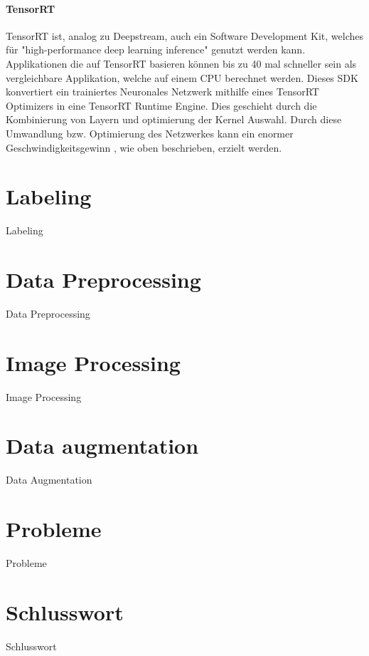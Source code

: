 \documentclass[a4paper,oneside,12pt]{report}
\begin{document}
\begin{onehalfspace}
		\subsubsection*{TensorRT}
		TensorRT ist, analog zu Deepstream, auch ein Software Development Kit, welches für "high-performance deep learning inference"
		 genutzt werden kann.
		Applikationen die auf TensorRT basieren können bis zu 40 mal schneller sein als vergleichbare Applikation, welche auf einem CPU berechnet werden.
		Dieses SDK konvertiert ein trainiertes Neuronales Netzwerk mithilfe eines TensorRT Optimizers in eine TensorRT Runtime Engine. Dies geschieht durch die Kombinierung von Layern und optimierung der Kernel Auswahl.
		Durch diese Umwandlung bzw. Optimierung des Netzwerkes kann ein enormer Geschwindigkeitsgewinn , wie oben beschrieben, erzielt werden.
	\end{onehalfspace}
	\chapter*{Labeling}
	\begin{onehalfspace}
		Labeling
	\end{onehalfspace}
	\chapter*{Data Preprocessing}
	\begin{onehalfspace}
		Data Preprocessing
	\end{onehalfspace}
	\chapter*{Image Processing}
	\begin{onehalfspace}
		Image Processing
	\end{onehalfspace}
	\chapter*{Data augmentation}
	\begin{onehalfspace}
		Data Augmentation
	\end{onehalfspace}
	\chapter*{Probleme}
	\begin{onehalfspace}
		Probleme
	\end{onehalfspace}
	\chapter*{Schlusswort}
	\begin{onehalfspace}
		Schlusswort
	\end{onehalfspace}
	
\end{document}
